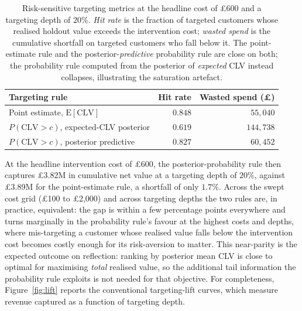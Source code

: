 \begin{table}[htbp]
  \centering
  \caption{Risk-sensitive targeting metrics at the headline cost of \pounds 600 and a targeting depth of $20\%$. \emph{Hit rate} is the fraction of targeted customers whose realised holdout value exceeds the intervention cost; \emph{wasted spend} is the cumulative shortfall on targeted customers who fall below it. The point-estimate rule and the posterior-\emph{predictive} probability rule are close on both; the probability rule computed from the posterior of \emph{expected} CLV instead collapses, illustrating the saturation artefact.}
  \label{tab:h3_risk}
  \begin{tabular}{lrr}
    \toprule
    Targeting rule & Hit rate & Wasted spend (\pounds) \\
    \midrule
    Point estimate, $\mathrm{E}[\text{CLV}]$            & $0.848$ & $55{,}040$ \\
    $P(\text{CLV} > c)$, expected-CLV posterior         & $0.619$ & $144{,}738$ \\
    $P(\text{CLV} > c)$, posterior predictive           & $0.827$ & $60{,}452$ \\
    \bottomrule
  \end{tabular}
\end{table}

At the headline intervention cost of \pounds 600, the posterior-probability rule then captures \pounds 3.82M in cumulative net value at a targeting depth of $20\%$, against \pounds 3.89M for the point-estimate rule, a shortfall of only $1.7\%$. Across the swept cost grid (\pounds 100 to \pounds 2{,}000) and across targeting depths the two rules are, in practice, equivalent: the gap is within a few percentage points everywhere and turns marginally in the probability rule's favour at the highest costs and depths, where mis-targeting a customer whose realised value falls below the intervention cost becomes costly enough for its risk-aversion to matter. This near-parity is the expected outcome on reflection: ranking by posterior mean CLV is close to optimal for maximising \emph{total} realised value, so the additional tail information the probability rule exploits is not needed for that objective. For completeness, Figure~\ref{fig:lift} reports the conventional targeting-lift curves, which measure revenue captured as a function of targeting depth.


